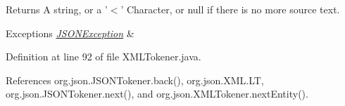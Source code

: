 \begin{DoxyReturn}{Returns}
A string, or a '$<$' Character, or null if there is no more source text. 
\end{DoxyReturn}

\begin{DoxyExceptions}{Exceptions}
{\em \hyperlink{classorg_1_1json_1_1_j_s_o_n_exception}{J\-S\-O\-N\-Exception}} & \\
\hline
\end{DoxyExceptions}


Definition at line 92 of file X\-M\-L\-Tokener.\-java.



References org.\-json.\-J\-S\-O\-N\-Tokener.\-back(), org.\-json.\-X\-M\-L.\-L\-T, org.\-json.\-J\-S\-O\-N\-Tokener.\-next(), and org.\-json.\-X\-M\-L\-Tokener.\-next\-Entity().


